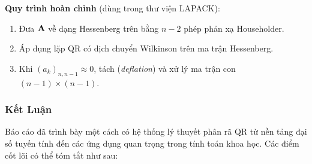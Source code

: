 \textbf{Quy trình hoàn chỉnh} (dùng trong thư viện LAPACK):
\begin{enumerate}[noitemsep]
    \item Đưa $\mathbf{A}$ về dạng Hessenberg trên bằng $n-2$ phép phản xạ Householder.
    \item Áp dụng lặp QR có dịch chuyển Wilkinson trên ma trận Hessenberg.
    \item Khi $(a_k)_{n,n-1} \approx 0$, tách (\textit{deflation}) và xử lý
          ma trận con $(n-1)\times(n-1)$.
\end{enumerate}

\subsubsection{Kết Luận}

Báo cáo đã trình bày một cách có hệ thống lý thuyết phân rã QR từ nền tảng đại số
tuyến tính đến các ứng dụng quan trọng trong tính toán khoa học. Các điểm cốt lõi
có thể tóm tắt như sau:

